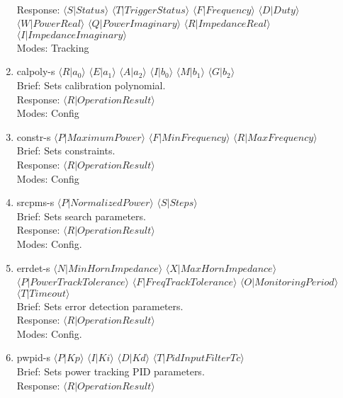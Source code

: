 \documentclass{article}
\begin{document}
\begin{enumerate}
            \\ Response: $\langle S|Status \rangle$ $\langle T|TriggerStatus\rangle$ $\langle F|Frequency \rangle$ $\langle D|Duty \rangle$
            $\langle W|PowerReal \rangle$ $\langle Q|PowerImaginary \rangle$ $\langle R|ImpedanceReal \rangle$
            $\langle I|ImpedanceImaginary \rangle$
            \\ Modes: Tracking
      \item calpoly-s $\langle R|a_0 \rangle$ $\langle E|a_1 \rangle$ $\langle A|a_2 \rangle$
            $\langle I|b_0 \rangle$ $\langle M|b_1 \rangle$ $\langle G|b_2 \rangle$
            \\ Brief: Sets calibration polynomial.
            \\ Response: $\langle R|OperationResult \rangle$
            \\ Modes: Config
      \item constr-s $\langle P|MaximumPower \rangle$ $\langle F|MinFrequency \rangle$ $\langle R|MaxFrequency \rangle$
            \\ Brief: Sets constraints.
            \\ Response: $\langle R|OperationResult \rangle$
            \\ Modes: Config
      \item srcpms-s $\langle P|NormalizedPower \rangle$  $\langle S|Steps \rangle$
            \\ Brief: Sets search parameters.  
            \\ Response: $\langle R|OperationResult \rangle$
            \\ Modes: Config.
      \item errdet-s $\langle N|MinHornImpedance \rangle$ $\langle X|MaxHornImpedance \rangle$
            $\langle P|PowerTrackTolerance \rangle$ $\langle F|FreqTrackTolerance \rangle$
            $\langle O|MonitoringPeriod \rangle$ $\langle T|Timeout \rangle$
            \\ Brief: Sets error detection parameters. 
            \\ Response: $\langle R|OperationResult \rangle$
            \\ Modes: Config.
      \item pwpid-s $\langle P|Kp \rangle$ $\langle I|Ki \rangle$ $\langle D|Kd \rangle$
            $\langle T|PidInputFilterTc \rangle$
            \\ Brief: Sets power tracking PID parameters.
            \\ Response: $\langle R|OperationResult \rangle$

\end{enumerate}
\end{document}
